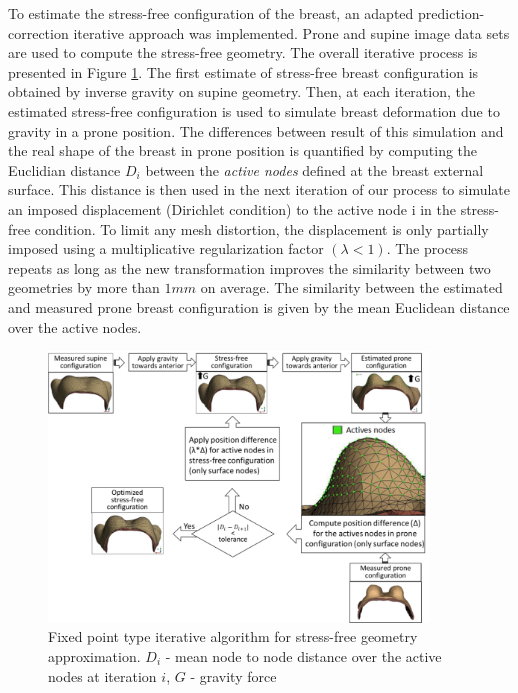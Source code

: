 \label{section:myStressFree}
To estimate the stress-free configuration of the breast, an adapted prediction-correction iterative approach was implemented. Prone and supine image data sets are used to compute the stress-free geometry. The overall iterative process is presented in Figure \ref{fig:myfixedpointalgo}. The first estimate of stress-free breast configuration is obtained by inverse gravity on supine geometry. Then, at each iteration, the estimated stress-free configuration is used to simulate breast deformation due to gravity in a prone position. The differences between result of this simulation and the real shape of the breast in prone position is quantified by computing the Euclidian distance $D_i$ between the \textit{active nodes} defined at the breast external surface. This distance is then used in the next iteration of our process to simulate an imposed displacement (Dirichlet condition) to the active node i in the stress-free condition. To limit any mesh distortion, the displacement is only partially imposed using a multiplicative regularization factor $ (\lambda<1)$. The process repeats as long as the new transformation improves the similarity between two geometries by more than $1mm$ on average. The similarity between the estimated and measured prone breast configuration is given by the mean Euclidean distance over the active nodes.                                                              

\begin{figure}[!h]
\centering
\includegraphics[width=0.9\textwidth,keepaspectratio]{figures/stress_free_config_algo.png} 
\caption{Fixed point type iterative algorithm for stress-free geometry approximation. $D_i$ - mean node to node distance over the active nodes at iteration $i$, $G$ - gravity force}\label{fig:myfixedpointalgo}
\end{figure}

